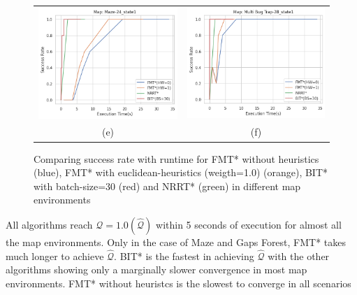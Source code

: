 \documentclass{article}
\begin{document}
\begin{figure}[H]
{\begin{tabular}{cc}
			\includegraphics[scale=0.45]{srVet_Maze-24_state1.png} & \includegraphics[scale=0.45]{srVet_Multi Bug Trap-28_state1.png}  \\
			(e) & (f)  \\[6pt]
		\end{tabular}
	}
	\caption{Comparing success rate with runtime for FMT* without heuristics (blue), FMT* with euclidean-heuristics (weigth=1.0) (orange), BIT* with batch-size=30 (red) and NRRT* (green) in different map environments}
\end{figure}

All algorithms reach $\mathcal{Q}=1.0 (\hat{\mathcal{Q}})$ within 5 seconds of execution for almost all the map environments. Only in the case of Maze and Gaps Forest, FMT* takes much longer to achieve $\hat{\mathcal{Q}}$. BIT* is the fastest in achieving $\hat{\mathcal{Q}}$ with the other algorithms showing only a marginally slower convergence in most map environments. FMT* without heuristcs is the slowest to converge in all scenarios
\end{document}
